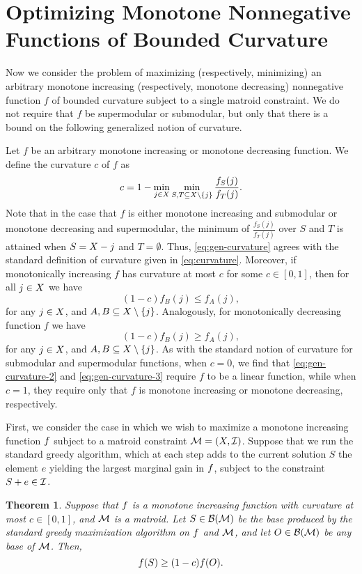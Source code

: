 \documentclass{article}
\newtheorem{theorem}{Theorem}[section]
\theoremstyle{definition}
\begin{document}
\section{Optimizing Monotone Nonnegative Functions of Bounded Curvature}
Now we consider the problem of maximizing (respectively, minimizing) an arbitrary monotone increasing (respectively, monotone decreasing) nonnegative  function $f$ of bounded curvature subject to a single matroid constraint.  We do not require that $f$ be supermodular or submodular, but only that there is a bound on the following generalized notion of curvature.

Let $f$ be an arbitrary monotone increasing or monotone decreasing function.  We define the curvature $c$ of $f$ as
\begin{equation}
\label{eq:gen-curvature}
c = 1 - \min_{j \in X} \min_{S,T \subseteq X \setminus \{j\}}\frac{f_S(j)}{f_T(j)}.
\end{equation}
Note that in the case that $f$ is either monotone increasing and submodular or monotone decreasing and supermodular, the minimum of $\frac{f_S(j)}{f_T(j)}$ over $S$ and $T$ is attained when $S = X - j$ and $T = \emptyset$.  Thus,  \eqref{eq:gen-curvature} agrees with the standard definition of curvature given in \eqref{eq:curvature}.  Moreover, if monotonically increasing $f$ has curvature at most $c$ for some $c \in [0,1]$, then for all $j \in X$ we have 
\begin{equation}
\label{eq:gen-curvature-2}
(1-c)f_B(j) \le f_A(j),
\end{equation}
for any $j \in X$, and $A,B \subseteq X \setminus \{j\}$.    
Analogously,  for monotonically decreasing function $f$ we have
\begin{equation}
\label{eq:gen-curvature-3}
(1-c)f_B(j) \ge f_A(j),
\end{equation}
for any $j \in X$, and $A,B \subseteq X \setminus \{j\}$.
As with the standard notion of curvature for submodular and supermodular functions, when $c = 0$, we find that \eqref{eq:gen-curvature-2} and  \eqref{eq:gen-curvature-3} require $f$ to be a linear function, while when $c = 1$, they require only that $f$ is monotone increasing or monotone decreasing, respectively.

First, we consider the case in which we wish to maximize a monotone increasing function $f$ subject to a matroid constraint $\mathcal{M} = (X,\mathcal{I})$.  Suppose that we run the standard greedy algorithm, which at each step adds to the current solution $S$ the element $e$ yielding the largest marginal gain in $f$, subject to the constraint $S + e \in \mathcal{I}$.
\begin{theorem}
\label{thm:arbitrary-max}
Suppose that $f$ is a monotone increasing function with curvature at most $c \in [0,1]$, and $\mathcal{M}$ is a matroid.  Let $S \in \mathcal{B}(\mathcal{M})$ be the base produced by the standard greedy maximization algorithm on $f$ and $\mathcal{M}$, and let $O \in \mathcal{B}(\mathcal{M})$ be any base of $\mathcal{M}$.  Then, 
\[f(S) \ge (1 -c)f(O).\]
\end{theorem}
\end{document}

